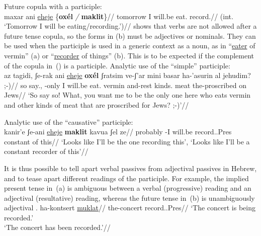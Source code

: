  \a Future copula with a participle:\\
 \begingl
     \gla \ljudge{*}maxar ani \underline{eheje} \{\textbf{ox\'el} \emph{/} \textbf{maklit}\}//
     \glb tomorrow I will.be eat. {} record.//
     \glft (int. `Tomorrow I will be eating/recording.')//
 \endgl
\xe
\cite{doron00} shows that verbs are not allowed after a future tense copula, so the forms in (\lastx b) must be adjectives or nominals. They can be used when the participle is used in a generic context as a noun, as in ``\underline{eater} of vermin'' (\nextx a) or ``\underline{recorder} of things'' (\nextx b). This is to be expected if the complement of the copula in~(\nextx) is a participle.
\pex \label{ex:pres-act2}
 \a Analytic use of the ``simple'' participle:\\
 \begingl
     \gla az tagidi, ʃe-rak ani \underline{eheje} \textbf{ox\'el} ʃratsim ve-ʃ'ar mini basar ha-'asurin al jehudim? ;-)//
     \glb so say., -only I will.be eat. vermin and-rest kinds. meat the-proscribed on Jews//
     \glft `So say so! What, you want me to be the only one here who eats vermin and other kinds of meat that are proscribed for Jews? ;-)'\footnotemark//
 \endgl
{}

 \a Analytic use of the ``causative'' participle:\\
 \begingl
     \gla kanir'e ʃe-ani \underline{eheje} \textbf{maklit} kavua ʃel ze//
     \glb probably -I will.be record..Pres constant of this//
     \glft `Looks like I'll be the one recording this', `Looks like I'll be a constant recorder of this'//
 \endgl
\xe

It is thus possible to tell apart verbal passives from adjectival passives in Hebrew, and to tease apart different readings of the participle. For example, the implied present tense in~(\nextx a) is ambiguous between a verbal (progressive) reading and an adjectival (resultative) reading, whereas the future tense in~(\nextx b) is unambiguously adjectival \citep{doron00,horvathsiloni08,meltzerasscher11}.
\pex \label{ex:pres-ambig}
    \a \begingl
        \gla ha-kontsert \underline{muklat}//
        \glb the-concert record..Pres//
        \glft `The concert is being recorded.'\\`The concert has been recorded.'//
    \endgl
        
